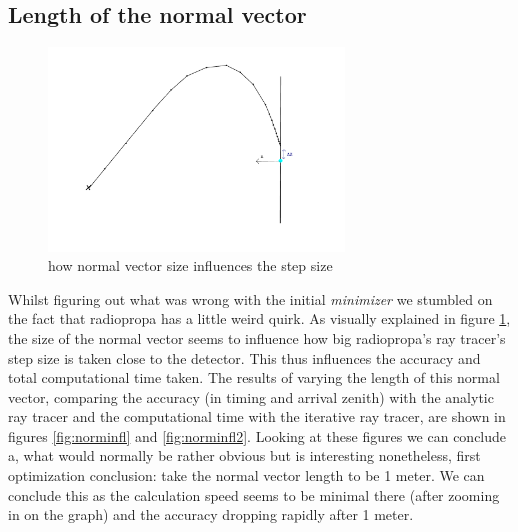 \subsection{Length of the normal vector}
\begin{figure}
	\centering
	\includegraphics[width=0.7\textwidth]{figures/PrincipleNormIllu.pdf}
	\caption{how normal vector size influences the step size}
	\label{fig:normexpl}
\end{figure}
Whilst figuring out what was wrong with the initial \textit{minimizer} we
stumbled on the fact that radiopropa has a little weird quirk.  As visually
explained in figure \ref{fig:normexpl}, the size of the normal vector seems to
influence how big radiopropa's ray tracer's step size is taken close to the
detector.  This thus influences the accuracy and total computational time
taken. The results of varying the length of this normal vector, comparing the
accuracy (in timing and arrival zenith) with the analytic ray tracer and the computational time with the
iterative ray tracer, are shown in figures \ref{fig:norminfl} and
\ref{fig:norminfl2}.  Looking at these figures we can conclude a, what would
normally be rather obvious but is interesting nonetheless, first optimization
conclusion: take the normal vector length to be 1 meter.
We can conclude this as the calculation speed seems to be minimal there (after zooming
in on the graph) and the accuracy dropping rapidly after 1 meter.

